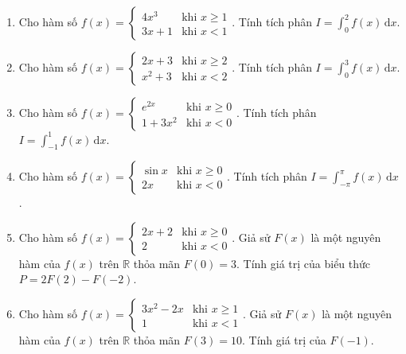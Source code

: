 \documentclass[12pt]{article}
\begin{document}
	\begin{btvang}
		\begin{enumerate}[label=\alph*)]
			\item Cho hàm số $f(x) = \begin{cases} 4x^3 & \text{khi } x \ge 1 \\ 3x + 1 & \text{khi } x < 1 \end{cases}$. Tính tích phân $I = \displaystyle \int_0^2 f(x)\,\mathrm{d}x$.
			\item Cho hàm số $f(x) = \begin{cases} 2x + 3 & \text{khi } x \ge 2 \\ x^2 + 3 & \text{khi } x < 2 \end{cases}$. Tính tích phân $I = \displaystyle \int_{0}^3 f(x)\,\mathrm{d}x$.
			\item Cho hàm số $f(x) = \begin{cases} e^{2x} & \text{khi } x \ge 0 \\ 1 + 3x^2 & \text{khi } x < 0 \end{cases}$. Tính tích phân $I = \displaystyle \int_{-1}^1 f(x)\,\mathrm{d}x$.
			\item Cho hàm số $f(x) = \begin{cases} \sin x & \text{khi } x \ge 0 \\ 2x & \text{khi } x < 0 \end{cases}$. Tính tích phân $I = \displaystyle \int_{-\pi}^{\pi} f(x)\,\mathrm{d}x$.
			\item Cho hàm số $f(x) = \begin{cases} 2x + 2 & \text{khi } x \ge 0 \\ 2 & \text{khi } x < 0 \end{cases}$. Giả sử $F(x)$ là một nguyên hàm của $f(x)$ trên $\mathbb{R}$ thỏa mãn $F(0) = 3$. Tính giá trị của biểu thức $P = 2F(2) - F(-2)$.
			\item Cho hàm số $f(x) = \begin{cases} 3x^2 - 2x & \text{khi } x \ge 1 \\ 1 & \text{khi } x < 1 \end{cases}$. Giả sử $F(x)$ là một nguyên hàm của $f(x)$ trên $\mathbb{R}$ thỏa mãn $F(3) = 10$. Tính giá trị của $F(-1)$.
		\end{enumerate}
	\end{btvang}
	
\end{document}
